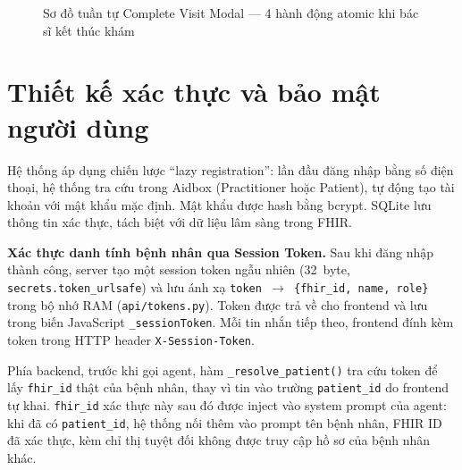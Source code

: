 \documentclass[a4paper,13pt,3p,twoside,openany]{report}
\theoremstyle{definition}
\theoremstyle{remark}
\theoremstyle{definition}
\let\ORIGsection\section
\renewcommand{\section}{\needspace{3\baselineskip}\ORIGsection}
\begin{document}
\begin{figure}[H]
\caption{Sơ đồ tuần tự Complete Visit Modal --- 4 hành động atomic khi bác sĩ kết thúc khám}
\label{fig:seq-flow-complete}
\end{figure}

\section{Thiết kế xác thực và bảo mật người dùng}

Hệ thống áp dụng chiến lược ``lazy registration'': lần đầu đăng nhập bằng số điện thoại, hệ thống tra cứu trong Aidbox (Practitioner hoặc Patient), tự động tạo tài khoản với mật khẩu mặc định. Mật khẩu được hash bằng bcrypt. SQLite lưu thông tin xác thực, tách biệt với dữ liệu lâm sàng trong FHIR.

\textbf{Xác thực danh tính bệnh nhân qua Session Token.}
Sau khi đăng nhập thành công, server tạo một session token ngẫu nhiên (32~byte, \texttt{secrets.token\_urlsafe}) và lưu ánh xạ \texttt{token~$\rightarrow$~\{fhir\_id, name, role\}} trong bộ nhớ RAM (\texttt{api/tokens.py}). Token được trả về cho frontend và lưu trong biến JavaScript \texttt{\_sessionToken}. Mỗi tin nhắn tiếp theo, frontend đính kèm token trong HTTP header \texttt{X-Session-Token}.

Phía backend, trước khi gọi agent, hàm \texttt{\_resolve\_patient()} tra cứu token để lấy \texttt{fhir\_id} thật của bệnh nhân, thay vì tin vào trường \texttt{patient\_id} do frontend tự khai. \texttt{fhir\_id} xác thực này sau đó được inject vào system prompt của agent: khi đã có \texttt{patient\_id}, hệ thống nối thêm vào prompt tên bệnh nhân, FHIR ID đã xác thực, kèm chỉ thị tuyệt đối không được truy cập hồ sơ của bệnh nhân khác.
\end{document}
